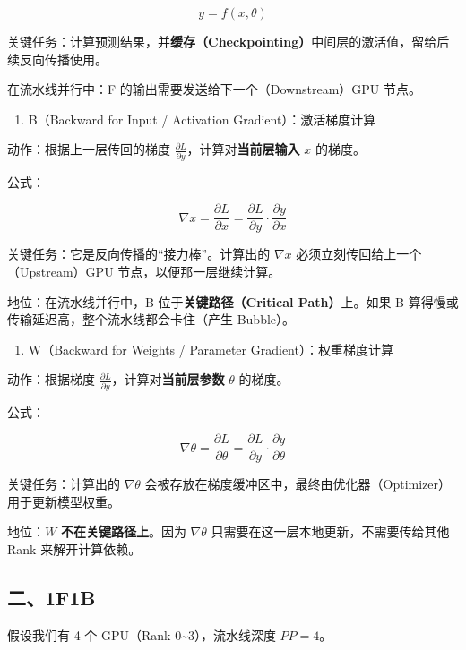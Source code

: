 \[
y = f(x, \theta)
\]

关键任务：计算预测结果，并\textbf{缓存（Checkpointing）}中间层的激活值，留给后续反向传播使用。

在流水线并行中：F 的输出需要发送给下一个（Downstream）GPU 节点。

\begin{enumerate}
\def\labelenumi{\arabic{enumi}.}
\setcounter{enumi}{1}
\tightlist
\item
  B（Backward for Input / Activation Gradient）：激活梯度计算
\end{enumerate}

动作：根据上一层传回的梯度 \(\frac{\partial L}{\partial y}\)，计算对\textbf{当前层输入} \(x\) 的梯度。

公式：

\[
\nabla x = \frac{\partial L}{\partial x} = \frac{\partial L}{\partial y} \cdot \frac{\partial y}{\partial x}
\]

关键任务：它是反向传播的``接力棒''。计算出的 \(\nabla x\) 必须立刻传回给上一个（Upstream）GPU 节点，以便那一层继续计算。

地位：在流水线并行中，B 位于\textbf{关键路径（Critical Path）}上。如果 B 算得慢或传输延迟高，整个流水线都会卡住（产生 Bubble）。

\begin{enumerate}
\def\labelenumi{\arabic{enumi}.}
\setcounter{enumi}{2}
\tightlist
\item
  W（Backward for Weights / Parameter Gradient）：权重梯度计算
\end{enumerate}

动作：根据梯度 \(\frac{\partial L}{\partial y}\)，计算对\textbf{当前层参数} \(\theta\) 的梯度。

公式：

\[
\nabla \theta = \frac{\partial L}{\partial \theta} = \frac{\partial L}{\partial y} \cdot \frac{\partial y}{\partial \theta}
\]

关键任务：计算出的 \(\nabla \theta\) 会被存放在梯度缓冲区中，最终由优化器（Optimizer）用于更新模型权重。

地位：\(W\) \textbf{不在关键路径上}。因为 \(\nabla \theta\) 只需要在这一层本地更新，不需要传给其他 Rank 来解开计算依赖。

\hypertarget{ux4e8c1f1b}{%
\subsection{二、1F1B}\label{ux4e8c1f1b}}

假设我们有 4 个 GPU（Rank 0\textasciitilde3），流水线深度 \(PP = 4\)。

